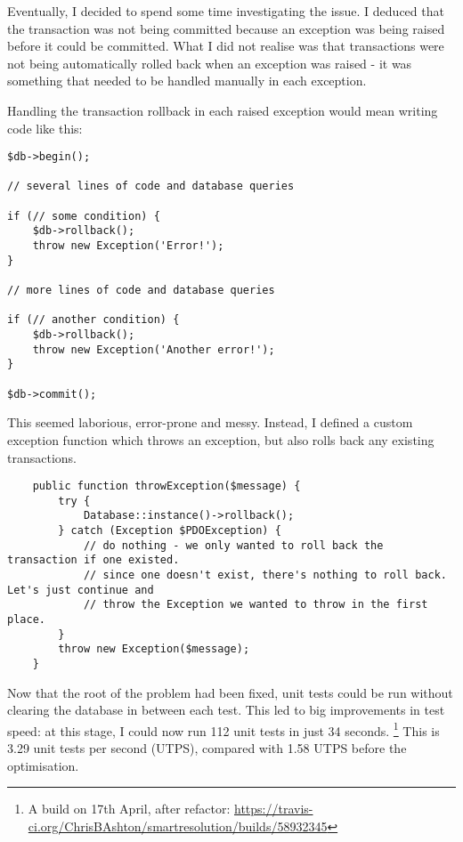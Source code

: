 Eventually, I decided to spend some time investigating the issue. I deduced that the transaction was not being committed because an exception was being raised before it could be committed. What I did not realise was that transactions were not being automatically rolled back when an exception was raised - it was something that needed to be handled manually in each exception.

Handling the transaction rollback in each raised exception would mean writing code like this:

\begin{minipage}{\textwidth}
\begin{lstlisting}
$db->begin();

// several lines of code and database queries

if (// some condition) {
    $db->rollback();
    throw new Exception('Error!');
}

// more lines of code and database queries

if (// another condition) {
    $db->rollback();
    throw new Exception('Another error!');
}

$db->commit();
\end{lstlisting}
\end{minipage}

This seemed laborious, error-prone and messy. Instead, I defined a custom exception function which throws an exception, but also rolls back any existing transactions.

\begin{minipage}{\textwidth}
\begin{lstlisting}
    public function throwException($message) {
        try {
            Database::instance()->rollback();
        } catch (Exception $PDOException) {
            // do nothing - we only wanted to roll back the transaction if one existed.
            // since one doesn't exist, there's nothing to roll back. Let's just continue and
            // throw the Exception we wanted to throw in the first place.
        }
        throw new Exception($message);
    }
\end{lstlisting}
\end{minipage}

Now that the root of the problem had been fixed, unit tests could be run without clearing the database in between each test. This led to big improvements in test speed: at this stage, I could now run 112 unit tests in just 34 seconds. \footnote{A build on 17th April, after refactor: \url{https://travis-ci.org/ChrisBAshton/smartresolution/builds/58932345}} This is 3.29 unit tests per second (UTPS), compared with 1.58 UTPS before the optimisation.

